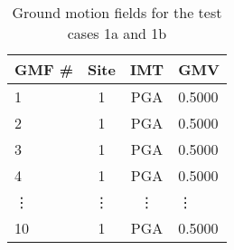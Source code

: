 \begin{table}[htbp]

\centering
\begin{tabular}{ l c c l }

\hline
\rowcolor{anti-flashwhite}
\bf{GMF \#} & \bf{Site} & \bf{IMT} & \bf{GMV}\\
\hline
1 & 1 & PGA & 0.5000 \\
2 & 1 & PGA & 0.5000 \\
3 & 1 & PGA & 0.5000 \\
4 & 1 & PGA & 0.5000 \\
\vdots & \vdots & \vdots & \vdots \\
10 & 1 & PGA & 0.5000 \\
\hline
\end{tabular}

\caption{Ground motion fields for the test cases 1a and 1b}
\label{tab:scenario-gmfs-identical-10}
\end{table}